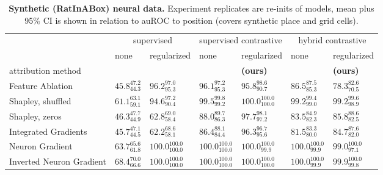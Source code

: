 \begin{table*}[t]
    \centering
        \caption{%
        \textbf{Synthetic (RatInABox) neural data.} Experiment replicates are re-inits of models, mean plus 95\% CI is shown in relation to auROC to position (covers synthetic place and grid cells).
    }
    \small
    \label{tbl:summary-scd}
    \vspace{-5pt}
    \begin{tabular}{lllllll}
    \toprule
     & \multicolumn{2}{c}{supervised} & \multicolumn{2}{c}{supervised contrastive} & \multicolumn{2}{c}{hybrid contrastive} \\
     & none & regularized & none & regularized & none & regularized \\
    attribution method &  &  &  &  \textbf{(ours)} &  &  \textbf{(ours)}\\
    \midrule
    Feature Ablation & $45.8_{44.3}^{47.2}$ & $96.2_{95.3}^{97.0}$ & $96.1_{95.3}^{97.2}$ & $95.8_{90.7}^{98.6}$ & $86.5_{85.3}^{87.5}$ & $78.3_{70.5}^{82.6}$ \\
    Shapley, shuffled & $61.1_{59.1}^{63.1}$ & $94.6_{90.4}^{97.2}$ & $99.5_{99.2}^{99.8}$ & $100.0_{100.0}^{100.0}$ & $99.2_{99.0}^{99.4}$ & $99.2_{98.9}^{99.6}$ \\
    Shapley, zeros & $46.3_{44.9}^{47.7}$ & $62.8_{58.4}^{69.0}$ & $88.0_{86.3}^{89.7}$ & $97.7_{97.2}^{98.1}$ & $83.5_{82.3}^{84.9}$ & $85.8_{82.5}^{88.6}$ \\
    Integrated Gradients & $45.7_{44.5}^{47.1}$ & $62.2_{58.1}^{68.6}$ & $86.4_{84.4}^{88.1}$ & $96.3_{95.6}^{96.7}$ & $81.5_{80.0}^{83.3}$ & $84.7_{82.0}^{87.6}$ \\
    \midrule
    Neuron Gradient & $63.7_{61.8}^{65.6}$ & $100.0_{100.0}^{100.0}$ & $100.0_{100.0}^{100.0}$ & $100.0_{99.9}^{100.0}$ & $100.0_{99.9}^{100.0}$ & $99.0_{97.1}^{100.0}$ \\
    Inverted Neuron Gradient & $68.4_{66.6}^{70.0}$ & $100.0_{100.0}^{100.0}$ & $100.0_{100.0}^{100.0}$ & $100.0_{100.0}^{100.0}$ & $100.0_{99.9}^{100.0}$ & $99.9_{99.8}^{100.0}$ \\
\bottomrule
\end{tabular}
\end{table*}


